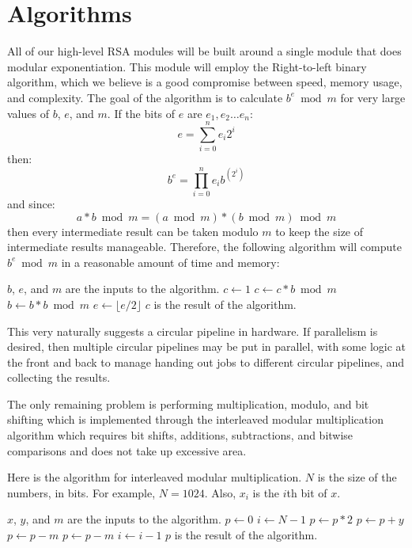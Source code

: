 \documentclass[12pt]{article}
\begin{document}
\section{Algorithms}
All of our high-level RSA modules will be built around a single module that does modular exponentiation.
This module will employ the Right-to-left binary algorithm, which we believe is a good compromise between speed, memory usage, and complexity.
The goal of the algorithm is to calculate $b^e \bmod m$ for very large values of $b$, $e$, and $m$.
If the bits of $e$ are $e_1, e_2 \dots e_n$:
\begin{equation}
e = \sum_{i = 0}^{n} e_i 2^i
\end{equation}
then:
\begin{equation}
b^e = \prod_{i = 0}^{n} e_i b^{(2^i)}
\end{equation}
and since:
\begin{equation}
a * b \bmod m = (a \bmod m) * (b \bmod m) \bmod m
\end{equation}
then every intermediate result can be taken modulo $m$ to keep the size of intermediate results manageable.
Therefore, the following algorithm will compute $b^e \bmod m$ in a reasonable amount of time and memory:
\begin{algorithmic}
\State $b$, $e$, and $m$ are the inputs to the algorithm.
\State $c \gets 1$
		\State $c \gets c * b \bmod m$
	\EndIf
	\State $b \gets b * b \bmod m$
	\State $e \gets \lfloor e / 2 \rfloor$
\EndWhile
\State $c$ is the result of the algorithm.
\end{algorithmic}
This very naturally suggests a circular pipeline in hardware.
If parallelism is desired, then multiple circular pipelines may be put in parallel,
with some logic at the front and back to manage handing out jobs to different circular pipelines,
and collecting the results.

The only remaining problem is performing multiplication, modulo, and bit shifting which is implemented through the interleaved modular multiplication algorithm which requires bit shifts, additions, subtractions, and bitwise comparisons and does not take up excessive area. 


Here is the algorithm for interleaved modular multiplication.
$N$ is the size of the numbers, in bits. For example, $N = 1024$.
Also, $x_i$ is the $i$th bit of $x$.
\begin{algorithmic}
\State $x$, $y$, and $m$ are the inputs to the algorithm.
\State $p \gets 0$
\State $i \gets N - 1$
	\State $p \gets p * 2$
		\State $p \gets p + y$
	\EndIf
		\State $p \gets p - m$
	\EndIf
		\State $p \gets p - m$
	\EndIf
  \State $i \gets i - 1$
\EndWhile
\State $p$ is the result of the algorithm.
\end{algorithmic}
\end{document}
